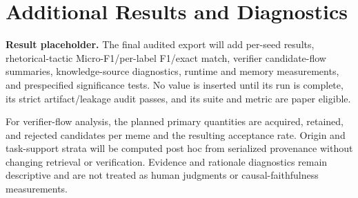 \section{Additional Results and Diagnostics}
\label{sec:supp:additional-results}

\textbf{Result placeholder.}  The final audited export will add per-seed
results, rhetorical-tactic Micro-F1/per-label F1/exact match, verifier
candidate-flow summaries, knowledge-source diagnostics, runtime and memory
measurements, and prespecified significance tests.  No value is inserted
until its run is complete, its strict artifact/leakage audit passes, and its
suite and metric are paper eligible.

For verifier-flow analysis, the planned primary quantities are acquired,
retained, and rejected candidates per meme and the resulting acceptance rate.
Origin and task-support strata will be computed post hoc from serialized
provenance without changing retrieval or verification.  Evidence and
rationale diagnostics remain descriptive and are not treated as human
judgments or causal-faithfulness measurements.

